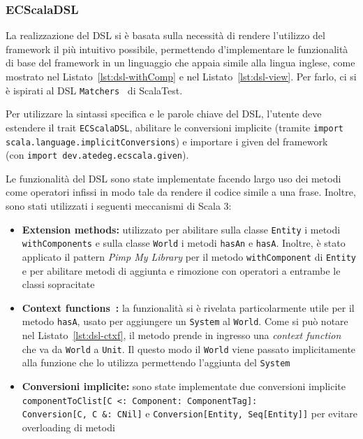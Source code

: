 \subsubsection{ECScalaDSL}\label{subsubsec:dsl-impl}
La realizzazione del DSL si è basata sulla necessità di rendere l'utilizzo del framework il più intuitivo possibile,
permettendo d'implementare le funzionalità di base del framework in un linguaggio che appaia simile alla lingua
inglese, come mostrato nel Listato~\ref{lst:dsl-withComp} e nel Listato~\ref{lst:dsl-view}.
Per farlo, ci si è ispirati al DSL \texttt{Matchers}~\cite{matchers} di ScalaTest.

Per utilizzare la sintassi specifica e le parole chiave del DSL, l'utente deve estendere il trait \texttt{ECScalaDSL},
abilitare le conversioni implicite (tramite \texttt{import scala.language.implicitConversions}) e importare i given del
framework\\(con \texttt{import dev.atedeg.ecscala.given}).





Le funzionalità del DSL sono state implementate facendo largo uso dei metodi come operatori infissi in modo tale
da rendere il codice simile a una frase.
Inoltre, sono stati utilizzati i seguenti meccanismi di Scala 3:
\begin{itemize}
    \item \textbf{Extension methods:} utilizzato per abilitare sulla classe \texttt{Entity} i metodi
    \texttt{withComponents} e sulla classe \texttt{World} i metodi \texttt{hasAn} e \texttt{hasA}.
    Inoltre, è stato applicato il pattern \textit{Pimp My Library} per il metodo \texttt{withComponent} di
    \texttt{Entity} e per abilitare metodi di aggiunta e rimozione con operatori a entrambe le classi sopracitate
    \item \textbf{Context functions~\cite{contextfunctions}:} la funzionalità si è rivelata particolarmente utile per il
    metodo \texttt{hasA}, usato per aggiungere un \texttt{System} al \texttt{World}.
    Come si può notare nel Listato~\ref{lst:dsl-ctxf}, il metodo prende in ingresso una \textit{context function} che va
    da \texttt{World} a \texttt{Unit}.
    Il questo modo il \texttt{World} viene passato implicitamente alla funzione che lo utilizza permettendo l'aggiunta
    del \texttt{System}
    \item \textbf{Conversioni implicite:} sono state implementate due conversioni implicite\\
    \texttt{componentToClist[C~<:~Component:~ComponentTag]:\\Conversion[C,~C~\&:~CNil]}
    e \texttt{Conversion[Entity,~Seq[Entity]]} per evitare overloading di metodi
\end{itemize}

